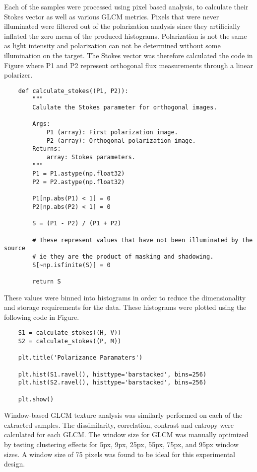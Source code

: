 Each of the samples were processed using pixel based analysis, to calculate their Stokes vector as well as various GLCM metrics.  Pixels that were never illuminated were filtered out of the polarization analysis since they artificially inflated the zero mean of the produced histograms.  Polarization is not the same as light intensity and polarization can not be determined without some illumination on the target.  The Stokes vector was therefore calculated the code in Figure where P1 and P2 represent orthogonal flux measurements through a linear polarizer.
%
\begin{lstlisting}
    def calculate_stokes((P1, P2)):
        """
        Calulate the Stokes parameter for orthogonal images.

        Args:
            P1 (array): First polarization image.
            P2 (array): Orthogonal polarization image.
        Returns:
            array: Stokes parameters.
        """
        P1 = P1.astype(np.float32)
        P2 = P2.astype(np.float32)

        P1[np.abs(P1) < 1] = 0
        P2[np.abs(P2) < 1] = 0

        S = (P1 - P2) / (P1 + P2)

        # These represent values that have not been illuminated by the source
        # ie they are the product of masking and shadowing.
        S[~np.isfinite(S)] = 0

        return S
\end{lstlisting}
%
These values were binned into histograms in order to reduce the dimensionality and storage requirements for the data.  These histograms were plotted using the following code in Figure.
%
\begin{lstlisting}
    S1 = calculate_stokes((H, V))
    S2 = calculate_stokes((P, M))

    plt.title('Polarizance Paramaters')

    plt.hist(S1.ravel(), histtype='barstacked', bins=256)
    plt.hist(S2.ravel(), histtype='barstacked', bins=256)

    plt.show()
\end{lstlisting}

Window-based GLCM texture analysis was similarly performed on each of the extracted samples.  The dissimilarity, correlation, contrast and entropy were calculated for each GLCM.  The window size for GLCM was manually optimized by testing clustering effects for 5px, 9px, 25px, 55px, 75px, and 95px window sizes.  A window size of 75 pixels was found to be ideal for this experimental design.

